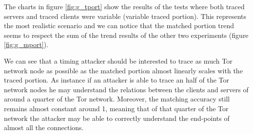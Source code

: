 The charts in figure \ref{fig:g_tport} show the results of the
tests where both traced servers and traced clients were variable
(variable traced portion). This
represents the most realistic scenario and we can notice that the
matched portion trend seems to respect the sum of the trend results of the other
two experiments (figure \ref{fig:g_mport}). 

We can see that a
timing attacker should be interested to trace as much Tor
network node as possible as the matched portion almost
linearly scales with the traced portion. As instance if an attacker is
able to trace an half of the Tor network nodes he may understand the
relations between the clients and servers of around a quarter of the Tor
network. Moreover, the matching accuracy still remains almost constant
around 1, meaning that of that quarter of the Tor network the attacker
may be able to correctly understand the end-points of almost all the connections.



